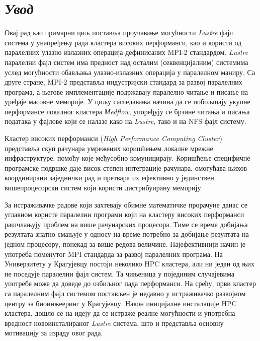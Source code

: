\chapter{ \textit{Увод} }

Овај рад као примарни циљ поставља проучавање могућности \textit{Lustre} фајл система у унапређењу рада кластера високих перформанси, као и користи од паралелних улазно излазних операција дефинисаних MPI-2 стандардом.
\textit{Lustre} паралелни фајл систем има предност над осталим (секвенцијалним) системима услед могућности обављања улазно-излазних операција у паралелном маниру. Са друге стране, MPI-2 представља индустријски стандард за развој паралелних програма, а његове имплементације подржавају паралелно читање и писање на уређаје масовне меморије. У циљу сагледавања начина да се побољшају укупне перформансе локалног кластера \textit{Мedflow}, упоређују се брзине читања и писања података у фајлове који се налазе како на \textit{Lustre}, тако и на NFS  фајл систему.

Кластер високих перформанси (\textit{High Performance Computing Cluster}) представља скуп рачунара умрежених коришћењем локалне мрежне инфраструктуре, помоћу које међусобно комуницирају. Коришћење специфичне програмске подршке даје висок степен интеграције рачунара, омогућава њихов координирани заједнички рад и претвара их ефективно у јединствен вишепроцесорски систем који користи дистрибуирану меморију.

За истраживачке радове који захтевају обимне математичке прорачуне данас се углавном користе паралелни програми који на кластеру високих перформанси рашчлањују проблем на више рачунарских процесора. Тиме се време добијања резултата знатно смањује у односу на време потребно за добијање резултата на једном процесору, понекад за више редова величине. Најефективнији начин је употреба поменутог MPI стандарда за развој паралелних програма. На Универзитету у Крагујевцу постоји неколико HPC кластера, али ни један од њих не поседује паралелни фајл систем. Та чињеница у појединим случајевима употребе може да доведе до озбиљног пада перформанси. На срећу, први кластер са паралелним фајл системом постављен је недавно у истраживачко развојном центру за биоинжееринг у Крагујевцу. Након иницијалне инсталације HPC кластера, дошло се на идеју да се истраже реалне могућности и употребна вредност новоинсталираног \textit{Lustre} система, што и представља основну мотивацију за израду овог рада.
 
